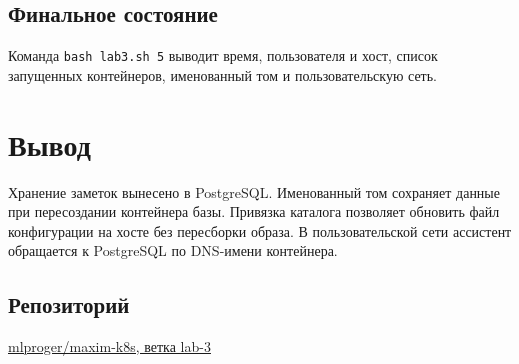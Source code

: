 \section{Финальное состояние}

Команда \texttt{bash lab3.sh 5} выводит время, пользователя и хост,
список запущенных контейнеров, именованный том и пользовательскую сеть.

\clearpage

\chapter{Вывод}

Хранение заметок вынесено в PostgreSQL. Именованный том сохраняет данные
при пересоздании контейнера базы. Привязка каталога позволяет обновить
файл конфигурации на хосте без пересборки образа. В пользовательской сети
ассистент обращается к PostgreSQL по DNS-имени контейнера.

\section*{Репозиторий}
\href{\RepositoryURL}{mlproger/maxim-k8s, ветка lab-3}

